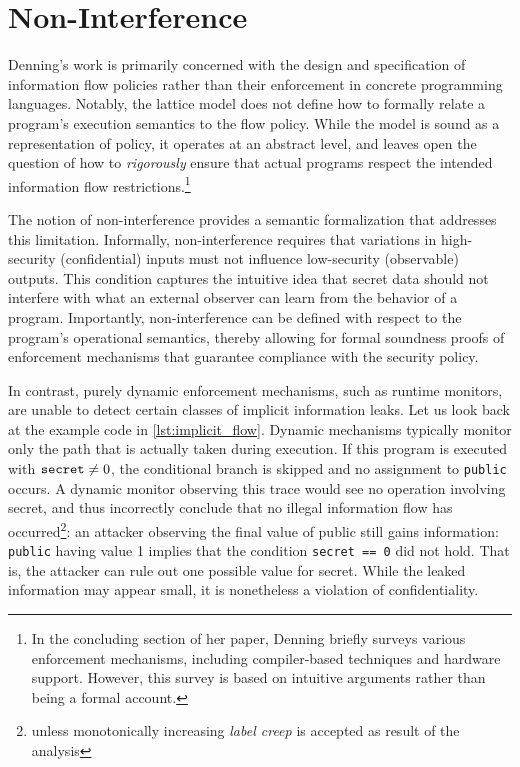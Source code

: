 \documentclass[12pt,a4paper,twoside]{book}
\begin{document}
\section{Non-Interference}
Denning's work\cite{denning1976lattice} is primarily concerned with the design and specification of information flow policies rather than their enforcement in concrete programming languages. Notably, the lattice model does not define how to formally relate a program's execution semantics to the flow policy. While the model is sound as a representation of policy, it operates at an abstract level, and leaves open the question of how to \textit{rigorously} ensure that actual programs respect the intended information flow restrictions.\footnote{In the concluding section of her paper, Denning briefly surveys various enforcement mechanisms, including compiler-based techniques and hardware support. However, this survey is based on intuitive arguments rather than being a formal account.}

The notion of non-interference\cite{goguen1982security} provides a semantic formalization that addresses this limitation. Informally, non-interference requires that variations in high-security (confidential) inputs must not influence low-security (observable) outputs\cite{volpano1996sound}. This condition captures the intuitive idea that secret data should not interfere with what an external observer can learn from the behavior of a program. Importantly, non-interference can be defined with respect to the program's operational semantics, thereby allowing for formal soundness proofs of enforcement mechanisms that guarantee compliance with the security policy\cite{volpano1996sound}.

In contrast, purely dynamic enforcement mechanisms, such as runtime monitors, are unable to detect certain classes of implicit information leaks\cite{sabelfeld2003language}.
Let us look back at the example code in \ref{lst:implicit_flow}.
Dynamic mechanisms typically monitor only the path that is actually taken during execution. If this program is executed with $\verb|secret| \ne 0$, the conditional branch is skipped and no assignment to \verb|public| occurs. A dynamic monitor observing this trace would see no operation involving secret, and thus incorrectly conclude that no illegal information flow has occurred\footnote{unless monotonically increasing \emph{label creep}\cite{sabelfeld2003language} is accepted as result of the analysis}: an attacker observing the final value of public still gains information: \verb|public| having value 1 implies that the condition \verb|secret == 0| did not hold. That is, the attacker can rule out one possible value for secret. While the leaked information may appear small, it is nonetheless a violation of confidentiality.
\end{document}
